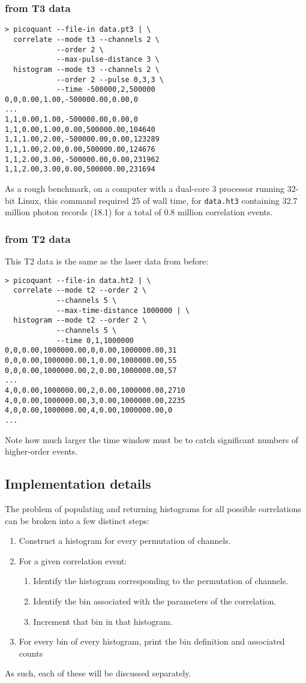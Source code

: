 \subsubsection{ from T3 data}
\begin{verbatim}
> picoquant --file-in data.pt3 | \
  correlate --mode t3 --channels 2 \
            --order 2 \
            --max-pulse-distance 3 \
  histogram --mode t3 --channels 2 \
            --order 2 --pulse 0,3,3 \
            --time -500000,2,500000
0,0,0.00,1.00,-500000.00,0.00,0
...
1,1,0.00,1.00,-500000.00,0.00,0
1,1,0.00,1.00,0.00,500000.00,104640
1,1,1.00,2.00,-500000.00,0.00,123289
1,1,1.00,2.00,0.00,500000.00,124676
1,1,2.00,3.00,-500000.00,0.00,231962
1,1,2.00,3.00,0.00,500000.00,231694
\end{verbatim}
As a rough benchmark, on a computer with a dual-core 3\giga\hertz{} processor running 32-bit Linux, this command required 25\second{} of wall time, for \texttt{data.ht3} containing 32.7 million photon records (18.1\kilo\cps) for a total of 0.8 million correlation events.

\subsubsection{\gn{3} from T2 data}
This T2 data is the same as the laser data from before:
\begin{verbatim}
> picoquant --file-in data.ht2 | \
  correlate --mode t2 --order 2 \
            --channels 5 \
            --max-time-distance 1000000 | \
  histogram --mode t2 --order 2 \
            --channels 5 \
            --time 0,1,1000000
0,0,0.00,1000000.00,0,0.00,1000000.00,31
0,0,0.00,1000000.00,1,0.00,1000000.00,55
0,0,0.00,1000000.00,2,0.00,1000000.00,57
...
4,0,0.00,1000000.00,2,0.00,1000000.00,2710
4,0,0.00,1000000.00,3,0.00,1000000.00,2235
4,0,0.00,1000000.00,4,0.00,1000000.00,0
...
\end{verbatim}
Note how much larger the time window must be to catch significant numbers of higher-order events.

\subsection{Implementation details}
The problem of populating and returning histograms for all possible correlations can be broken into a few distinct steps:
\begin{enumerate}
\item Construct a histogram for every permutation of channels.
\item For a given correlation event:
  \begin{enumerate}
  \item Identify the histogram corresponding to the permutation of channels.
  \item Identify the bin associated with the parameters of the correlation.
  \item Increment that bin in that histogram.
  \end{enumerate}
\item For every bin of every histogram, print the bin definition and associated counts
\end{enumerate}
As such, each of these will be discussed separately.

